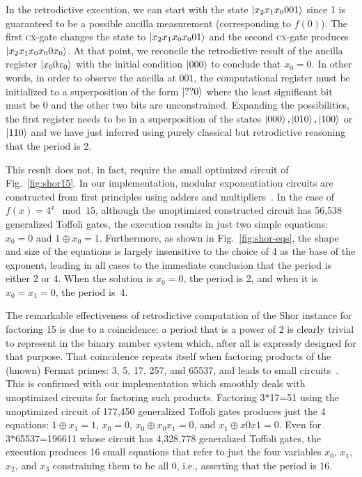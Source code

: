 \documentclass[sigplan,screen]{acmart}
\newcommand{\cx}{\textsc{cx}}
\theoremstyle{definition}
\begin{document}
In the retrodictive execution, we can start with the state
$\ket{x_2x_1x_0001}$ since 1 is guaranteed to be a possible ancilla
measurement (corresponding to $f(0)$). The first \cx-gate changes the
state to $\ket{x_2x_1x_0x_001}$ and the second \cx-gate produces
$\ket{x_2x_1x_0x_00x_0}$. At that point, we reconcile the retrodictive
result of the ancilla register $\ket{x_00x_0}$ with the initial
condition $\ket{000}$ to conclude that $x_0=0$. In other words, in
order to observe the ancilla at $001$, the computational register must
be initialized to a superposition of the form $\ket{??0}$ where the
least significant bit must be 0 and the other two bits are
unconstrained. Expanding the possibilities, the first register needs
to be in a superposition of the states $\ket{000}, \ket{010},
\ket{100}$ or $\ket{110}$ and we have just inferred using purely
classical but retrodictive reasoning that the period is
2.

This result does not, in fact, require the small optimized circuit of
Fig.~\ref{fig:shor15}. In our implementation, modular exponentiation
circuits are constructed from first principles using adders and
multipliers~\cite{PhysRevA.54.147}. In the case of $f(x) = 4^x
\mod{15}$, although the unoptimized constructed circuit has 56,538
generalized Toffoli gates,
the execution results in just two simple equations: $x_0 = 0$ and $1
\oplus x_0 = 1$. Furthermore, as shown in Fig.~\ref{fig:shor-eqs}, the
shape and size of the equations is largely insensitive to the choice
of 4 as the base of the exponent, leading in all cases to the
immediate conclusion that the period is either 2 or 4. When the
solution is $x_0=0$, the period is 2, and when it is $x_0=x_1=0$, the
period is~4.

The remarkable effectiveness of retrodictive computation of the Shor
instance for factoring 15 is due to a coincidence: a period that is a
power of 2 is clearly trivial to represent in the binary number system
which, after all is expressly designed for that purpose. That
coincidence repeats itself when factoring products of the (known)
Fermat primes: 3, 5, 17, 257, and 65537, and leads to small
circuits~\cite{shorFermat}. This is confirmed with our implementation
which smoothly deals with unoptimized circuits for factoring such
products. Factoring 3*17=51 using the unoptimized circuit of 177,450
generalized Toffoli gates produces just the 4 equations: $1 \oplus x_1
= 1$, $x_0 = 0$, $x_0 \oplus x_0x_1 = 0$, and $x_1 \oplus x0x1 =
0$. Even for 3*65537=196611 whose circuit has 4,328,778 generalized
Toffoli gates, the execution produces 16 small equations that refer to
just the four variables $x_0$, $x_1$, $x_2$, and $x_3$ constraining
them to be all 0, i.e., asserting that the period is 16.
\end{document}
